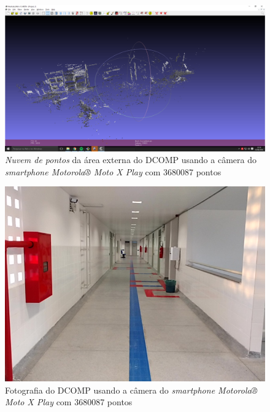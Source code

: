 \begin{figure}[H]
	\centering
		\includegraphics[width= \textwidth]{Imagens/dcompMotox.PNG}
	\caption{\textit{Nuvem de pontos} da área externa do DCOMP usando a câmera do \textit{smartphone Motorola® Moto X Play} com 3680087 pontos}
\end{figure}

\begin{figure}[H]
	\centering
		\includegraphics[width= \textwidth]{Imagens/scene00087.jpg}
	\caption{Fotografia do DCOMP usando a câmera do \textit{smartphone Motorola® Moto X Play} com 3680087 pontos}
\end{figure}

